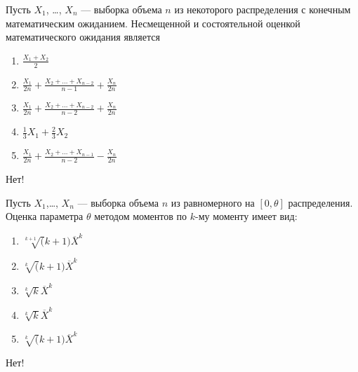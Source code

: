 \documentclass[t]{beamer}
\begin{document}
 \begin{frame} \label{2-No} 
\begin{block}{2} 

Пусть $X_1$, \ldots, $X_n$ — выборка объема $n$ из некоторого распределения с конечным математическим ожиданием. Несмещенной и состоятельной оценкой математического ожидания является
 


 \end{block} 
\begin{enumerate} 
\item[] \hyperlink{2-No}{\beamergotobutton{} $\frac{X_1+X_2}{2}$}
\item[] \hyperlink{2-No}{\beamergotobutton{} $\frac{X_1}{2 n}+\frac{X_2+\ldots+X_{n-2}}{n-1}+\frac{X_n}{2 n}$}
\item[] \hyperlink{2-No}{\beamergotobutton{} $\frac{X_1}{2 n}+\frac{X_2+\ldots+X_{n-2}}{n-2}+\frac{X_n}{2 n}$}
\item[] \hyperlink{2-No}{\beamergotobutton{} $\frac{1}{3} X_1 + \frac{2}{3} X_2$}
\item[] \hyperlink{2-Yes}{\beamergotobutton{} $\frac{X_1}{2 n}+\frac{X_2+\ldots+X_{n-1}}{n-2}-\frac{X_n}{2 n}$}
\end{enumerate} 

 \alert{Нет!} 
\end{frame} 


 \begin{frame} \label{3-No} 
\begin{block}{3} 

Пусть $X_1$,\ldots, $X_n$ — выборка объема $n$ из равномерного на $[0, \theta]$ распределения. Оценка параметра $\theta$ методом моментов по $k$-му моменту имеет вид:
 


 \end{block} 
\begin{enumerate} 
\item[] \hyperlink{3-No}{\beamergotobutton{} $\sqrt[k+1](k+1) \overline X^k$}
\item[] \hyperlink{3-Yes}{\beamergotobutton{} $\sqrt[k](k+1) \overline X^k$}
\item[] \hyperlink{3-No}{\beamergotobutton{} $\sqrt[k]k \overline X^k$}
\item[] \hyperlink{3-No}{\beamergotobutton{} $\sqrt[k]k \overline X^k$}
\item[] \hyperlink{3-No}{\beamergotobutton{} $\sqrt[k](k+1) \overline X^k$}
\end{enumerate} 

 \alert{Нет!} 
\end{frame} 
\end{document}

